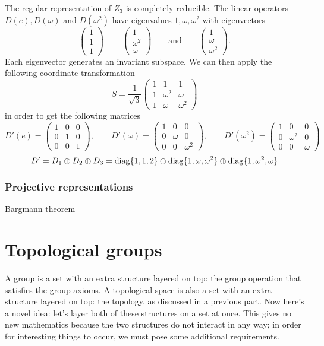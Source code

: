 \begin{example}
The regular representation of $Z_3$ is completely reducible. The linear operators $D(e), D(\omega)$ and $D(\omega^2)$ have eigenvalues $1,\omega, \omega^2$ with eigenvectors 
\[ \begin{pmatrix}
1\\1\\1
\end{pmatrix}\, \qquad \begin{pmatrix}
1\\ \omega^2 \\ \omega
\end{pmatrix} \qquad \text{and} \qquad \begin{pmatrix}
1 \\ \omega \\ \omega^2
\end{pmatrix}. \]
Each eigenvector generates an invariant subspace. We can then apply the following coordinate transformation
\[ S = \frac{1}{\sqrt{3}}\begin{pmatrix}
1&1&1\\
1&\omega^2 & \omega \\
1&\omega& \omega^2
\end{pmatrix} \]
in order to get the following matrices
\[D'(e) = \begin{pmatrix}
1&0&0\\
0&1&0\\
0&0&1
\end{pmatrix}, \qquad D'(\omega) = \begin{pmatrix}
1 & 0 & 0\\
0& \omega & 0 \\
0&0&\omega^2
\end{pmatrix}, \qquad D'(\omega^2) = \begin{pmatrix}
1 & 0 & 0\\
0& \omega^2 & 0 \\
0&0&\omega
\end{pmatrix}\]
\[ D' = D_1\oplus D_2 \oplus D_3 = \operatorname{diag}\{1,1,2\}\oplus \operatorname{diag}\{1,\omega, \omega^2\} \oplus \operatorname{diag}\{1, \omega^2, \omega\} \]
\end{example}

\subsubsection{Projective representations}
Bargmann theorem



\section{Topological groups}
A group is a set with an extra structure layered on top: the group operation that satisfies the group axioms. A topological space is also a set with an extra structure layered on top: the topology, as discussed in a previous part. Now here's a novel idea: let's layer both of these structures on a set at once. This gives no new mathematics because the two structures do not interact in any way; in order for interesting things to occur, we must pose some additional requirements.

